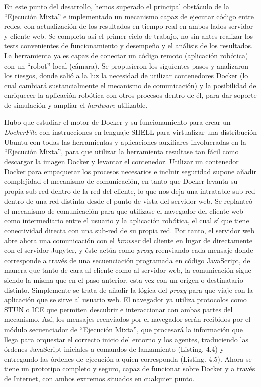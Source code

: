 En este punto del desarrollo, hemos superado el principal obstáculo de la ``Ejecución Mixta'' e implementado un mecanismo capaz de ejecutar código entre redes, con actualización de los resultados en tiempo real en ambos lados servidor  y cliente web. Se completa así el primer ciclo de trabajo, no sin antes realizar los tests convenientes de funcionamiento y desempeño y el análisis de los resultados. La herramienta ya es capaz de conectar un código remoto (aplicación robótica) con un ``robot'' local (cámara). Se propusieron los siguientes pasos y analizaron los riesgos, donde salió a la luz la necesidad de utilizar contenedores Docker (lo cual cambiará sustancialmente el mecanismo de comunicación) y la posibilidad de enriquecer la aplicación robótica con otros procesos dentro de él, para dar soporte de simulación y ampliar el \textit{hardware} utilizable.

Hubo que estudiar el motor de Docker y su funcionamiento para crear un \textit{DockerFile} con instrucciones en lenguaje SHELL para virtualizar una distribución Ubuntu con todas las herramientas y aplicaciones auxiliares involucradas en la ``Ejecución Mixta'', para que utilizar la herramienta resultase tan fácil como descargar la imagen Docker y levantar el contenedor. Utilizar un contenedor Docker para empaquetar los procesos necesarios e incluir seguridad supone añadir complejidad el mecanismo de comunicación, en tanto que Docker levanta su propia sub-red dentro de la red del cliente, lo que nos deja una intratable sub-red dentro de una red distinta desde el punto de vista del servidor web. Se replanteó el mecanismo de comunicación para que utilizase el navegador del cliente web como intermediario entre el usuario y la aplicación robótica, el cual sí que tiene conectividad directa con una sub-red de su propia red. Por tanto, el servidor web abre ahora una comunicación con el \textit{browser} del cliente en lugar de directamente con el servidor Jupyter, y éste actúa como \textit{proxy} reenviando cada mensaje donde corresponde a través de una secuenciación programada en código JavaScript, de manera que tanto de cara al cliente como al servidor web, la comunicación sigue siendo la misma que en el paso anterior, esta vez con un origen o destinatario distinto. Simplemente se trata de añadir la lógica del \textit{proxy} para que viaje con la aplicación que se sirve al usuario web. El navegador ya utiliza protocolos como STUN o ICE que permiten descubrir e interaccionar con ambas partes del mecanismo. Así, los mensajes reenviados por el navegador serán recibidos por el módulo secuenciador de ``Ejecución Mixta'', que procesará la información que llega para orquestar el correcto inicio del entorno y los agentes, traduciendo las órdenes JavaScript iniciales a comandos de lanzamiento (Listing. 4.4) y entregando las órdenes de ejecución a quien corresponda (Listing. 4.5). Ahora se tiene un prototipo completo y seguro, capaz de funcionar sobre Docker y a través de Internet, con ambos extremos situados en cualquier punto.

